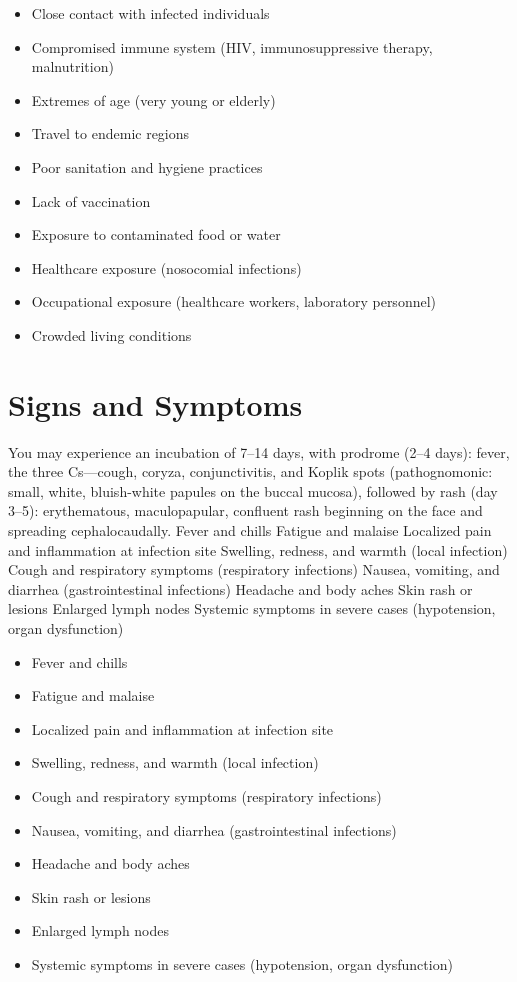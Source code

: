\begin{itemize}[noitemsep]
  \item Close contact with infected individuals
  \item Compromised immune system (HIV, immunosuppressive therapy, malnutrition)
  \item Extremes of age (very young or elderly)
  \item Travel to endemic regions
  \item Poor sanitation and hygiene practices
  \item Lack of vaccination
  \item Exposure to contaminated food or water
  \item Healthcare exposure (nosocomial infections)
  \item Occupational exposure (healthcare workers, laboratory personnel)
  \item Crowded living conditions
\end{itemize}
\section{Signs and Symptoms}
You may experience an incubation of 7--14 days, with prodrome (2--4 days): fever, the three Cs---cough, coryza, conjunctivitis, and Koplik spots (pathognomonic: small, white, bluish-white papules on the buccal mucosa), followed by rash (day 3--5): erythematous, maculopapular, confluent rash beginning on the face and spreading cephalocaudally. Fever and chills Fatigue and malaise Localized pain and inflammation at infection site Swelling, redness, and warmth (local infection) Cough and respiratory symptoms (respiratory infections) Nausea, vomiting, and diarrhea (gastrointestinal infections) Headache and body aches Skin rash or lesions Enlarged lymph nodes Systemic symptoms in severe cases (hypotension, organ dysfunction)

\begin{itemize}[noitemsep]
  \item Fever and chills
  \item Fatigue and malaise
  \item Localized pain and inflammation at infection site
  \item Swelling, redness, and warmth (local infection)
  \item Cough and respiratory symptoms (respiratory infections)
  \item Nausea, vomiting, and diarrhea (gastrointestinal infections)
  \item Headache and body aches
  \item Skin rash or lesions
  \item Enlarged lymph nodes
  \item Systemic symptoms in severe cases (hypotension, organ dysfunction)
\end{itemize}
